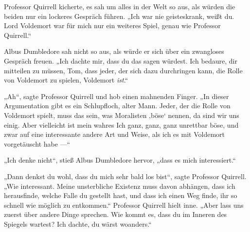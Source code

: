 Professor Quirrell kicherte, es sah um alles in der Welt so aus, als würden die beiden nur ein lockeres Gespräch führen.
„Ich war nie geisteskrank, weißt du. Lord Voldemort war für mich nur ein weiteres Spiel, genau wie Professor Quirrell.“

Albus Dumbledore sah nicht so aus, als würde er sich über ein zwangloses Gespräch freuen.
„Ich dachte mir, dass du das sagen würdest. Ich bedaure, dir mitteilen zu müssen, Tom, dass jeder, der sich dazu durchringen kann, die Rolle von Voldemort zu spielen, Voldemort \emph{ist}.“

„Ah“, sagte Professor Quirrell und hob einen mahnenden Finger.
„In dieser Argumentation gibt es ein Schlupfloch, alter Mann. Jeder, der die Rolle von Voldemort spielt, muss das sein, was Moralisten ‚böse‘ nennen, da sind wir uns einig. Aber vielleicht ist mein wahres Ich ganz, ganz, ganz unrettbar böse, und zwar auf eine interessante andere Art und Weise, als ich es mit Voldemort vorgetäuscht habe —“

„Ich denke nicht“, stieß Albus Dumbledore hervor, „dass es mich interessiert.“

„Dann denkst du wohl, dass du mich sehr bald los bist“, sagte Professor Quirrell.
„Wie interessant. Meine unsterbliche Existenz muss davon abhängen, dass ich herausfinde, welche Falle du gestellt hast, und dass ich einen Weg finde, ihr so schnell wie möglich zu entkommen.“ Professor Quirrell hielt inne.
„Aber lass uns zuerst über andere Dinge sprechen. Wie kommt es, dass du im Inneren des Spiegels wartest? Ich dachte, du wärst woanders.“

